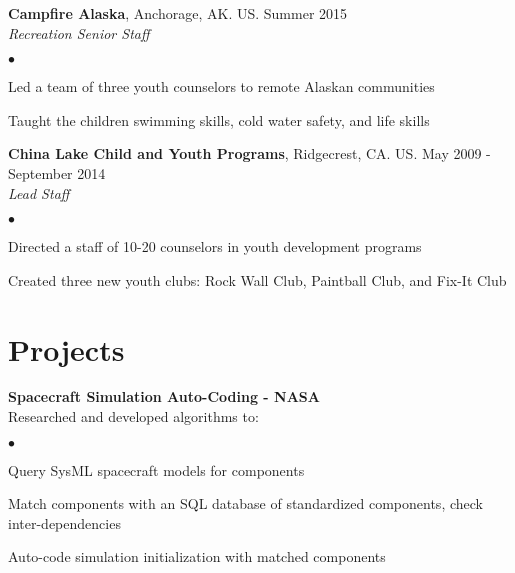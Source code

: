 \documentclass[margin,line]{res}
\newenvironment{list2}{
  \begin{list}{$\bullet$}{%
      \setlength{\itemsep}{0in}
      \setlength{\parsep}{0in} \setlength{\parskip}{0in}
      \setlength{\topsep}{0in} \setlength{\partopsep}{0in}
      \setlength{\leftmargin}{0.2in}}}{\end{list}}
\begin{document}
\begin{resume}
{\bf Campfire Alaska}, Anchorage, AK. US. \hfill{Summer 2015}\\
{\em Recreation Senior Staff}\hfill 
\begin{list2} %
\item Led a team of three youth counselors to remote Alaskan communities  
\item Taught the children swimming skills, cold water safety, and life skills 
\end{list2}



{\bf China Lake Child and Youth Programs}, Ridgecrest, CA. US. \hfill{May 2009 - September 2014}\\
{\em Lead Staff}\hfill 
\begin{list2} %
\item Directed a staff of 10-20 counselors in youth development programs
\item Created three new youth clubs: Rock Wall Club, Paintball Club, and Fix-It Club
\end{list2}

\section{\sc Projects}
{\bf Spacecraft Simulation Auto-Coding - NASA}\\
{Researched and developed algorithms to:}
\begin{list2}
\item Query SysML spacecraft models for components
\item Match components with an SQL database of standardized components, check inter-dependencies
\item Auto-code simulation initialization with matched components
\end{list2}




\end{resume}
\end{document}
